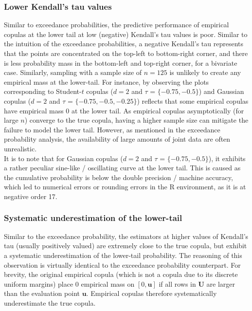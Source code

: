 \documentclass[12pt]{report}
\newcommand{\1}{\mathbf{1}}
\begin{document}
\begin{flushleft}
\subsubsection{Lower Kendall's tau values}
Similar to exceedance probabilities, the predictive performance of empirical copulas at the lower tail at low (negative) Kendall's tau values is poor. Similar to the intuition of the exceedance probabilities, a negative Kendall's tau represents that the points are concentrated on the top-left to bottom-right corner, and there is less probability mass in the bottom-left and top-right corner, for a bivariate case. Similarly, sampling with a sample size of $n = 125$ is unlikely to create any empirical mass at the lower-tail. For instance, by observing the plots corresponding to Student-$t$ copulas ($d = 2$ and $\tau$ = $\{ -0.75, -0.5 \}$) and Gaussian copulas ($d = 2$ and $\tau$ = $\{-0.75, -0.5, -0.25\}$) reflects that some empirical copulas have empirical mass 0 at the lower tail. As empirical copulas asymptotically (for large $n$) converge to the true copula, having a higher sample size can mitigate the failure to model the lower tail. However, as mentioned in the exceedance probability analysis, the availability of large amounts of joint data are often unrealistic.\\
\vspace{0.5cm}
It is to note that for Gaussian copulas ($d = 2$ and $\tau$ = $\{-0.75, -0.5\}$), it exhibits a rather peculiar sine-like / oscillating curve at the lower tail. This is caused as the cumulative probability is below the double precision / machine accuracy, which led to numerical errors or rounding errors in the R environment, as it is at negative order 17.
\subsubsection{Systematic underestimation of the lower-tail}
Similar to the exceedance probability, the estimators at higher values of Kendall's tau (usually positively valued) are extremely close to the true copula, but exhibit a systematic underestimation of the lower-tail probability. The reasoning of this observation is virtually identical to the exceedance probability counterpart. For brevity, the original empirical copula (which is not a copula due to its discrete uniform margins) place 0 empirical mass on $[0,\boldsymbol{u}]$ if all rows in $\boldsymbol{U}$ are larger than the evaluation point $\boldsymbol{u}$. Empirical copulas therefore systematically underestimate the true copula. \\

\end{flushleft}
\end{document}
